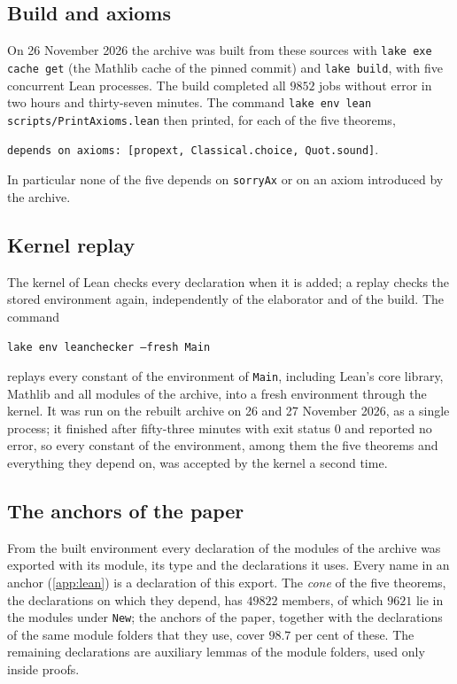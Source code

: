 \subsection{Build and axioms}\label{ss:E-build}
On 26 November 2026 the archive was built from these sources with \texttt{lake exe cache get} (the Mathlib cache of the pinned commit) and \texttt{lake build}, with five concurrent Lean processes. The build
completed all $9852$ jobs without error in two hours and thirty-seven minutes. The command \texttt{lake env lean scripts/PrintAxioms.lean} then printed, for each of the five theorems,
\begin{center}\small
\texttt{depends on axioms: [propext, Classical.choice, Quot.sound]}.
\end{center}
In particular none of the five depends on \texttt{sorryAx} or on an axiom introduced by the archive.

\subsection{Kernel replay}\label{ss:E-replay}
The kernel of Lean checks every declaration when it is added; a replay checks the stored environment again, independently of the elaborator and of the build. The command
\begin{center}\small
\texttt{lake env leanchecker --fresh Main}
\end{center}
replays every constant of the environment of \texttt{Main}, including Lean's core library, Mathlib and all modules of the archive, into a fresh environment through the kernel.
It was run on the rebuilt archive on 26 and 27 November 2026, as a single process; it finished after fifty-three minutes with exit status $0$ and reported no error, so every constant of the
environment, among them the five theorems and everything they depend on, was accepted by the kernel a second time.

\subsection{The anchors of the paper}\label{ss:E-anchors}
From the built environment every declaration of the modules of the archive was exported with its module, its type and the declarations it uses. Every name in an anchor
(\cref{app:lean}) is a declaration of this export. The \emph{cone} of the five theorems, the declarations on which they depend, has $49822$ members, of which $9621$ lie in the modules under \texttt{New}; the anchors of the paper,
together with the declarations of the same module folders that they use, cover $98.7$ per cent of these. The remaining declarations are auxiliary lemmas of the module folders, used only inside proofs.
